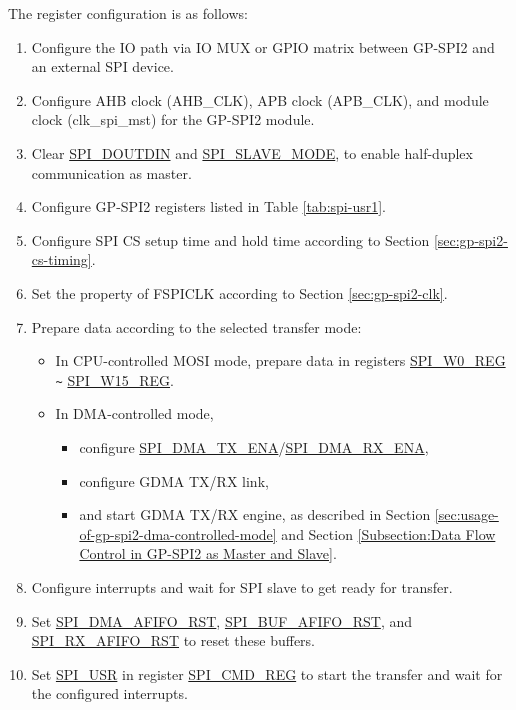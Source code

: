 \documentclass[main\_\_EN.tex]{subfiles}
\begin{document}
The register configuration is as follows:
\begin{enumerate}
    \item Configure the IO path via IO MUX or GPIO matrix between GP-SPI2 and an external SPI device. 
    \item Configure AHB clock (AHB\_CLK), APB clock (APB\_CLK), and module clock (clk\_spi\_mst) for the GP-SPI2 module.

    \item Clear \hyperref[fielddesc:SPIDOUTDIN]{SPI\_DOUTDIN} and \hyperref[fielddesc:SPISLAVEMODE]{SPI\_SLAVE\_MODE}, to enable half-duplex communication as master.
    
    \item Configure GP-SPI2 registers listed in Table \ref{tab:spi-usr1}.
    
    \item Configure SPI CS setup time and hold time according to Section \ref{sec:gp-spi2-cs-timing}.
    
    \item Set the property of FSPICLK according to Section \ref{sec:gp-spi2-clk}. 
    
    \item Prepare data according to the selected transfer mode:
    \begin{itemize}
        \item In CPU-controlled MOSI mode, prepare data in registers \hyperref[regdesc:SPIW0REG]{SPI\_W0\_REG} \verb+~+ \hyperref[regdesc:SPIW0REG]{SPI\_W15\_REG}. 
        
        \item In DMA-controlled mode, 
        \begin{itemize}
            \item configure \hyperref[fielddesc:SPIDMATXENA]{SPI\_DMA\_TX\_ENA}/\hyperref[fielddesc:SPIDMARXENA]{SPI\_DMA\_RX\_ENA},
            \item configure GDMA TX/RX link,
            \item and start GDMA TX/RX engine, as described in Section \ref{sec:usage-of-gp-spi2-dma-controlled-mode} and Section \ref{Subsection:Data Flow Control in GP-SPI2 as Master and Slave}.
        \end{itemize}
    \end{itemize}
    
    \item Configure interrupts and wait for SPI slave to get ready for transfer.
    
    \item Set \hyperref[fielddesc:SPIDMAAFIFORST]{SPI\_DMA\_AFIFO\_RST}, \hyperref[fielddesc:SPIBUFAFIFORST]{SPI\_BUF\_AFIFO\_RST}, and \hyperref[fielddesc:SPIRXAFIFORST]{SPI\_RX\_AFIFO\_RST} to reset these buffers.

    \item Set \hyperref[fielddesc:SPIUSR]{SPI\_USR} in register \hyperref[regdesc:SPICMDREG]{SPI\_CMD\_REG} to start the transfer and wait for the configured interrupts.
\end{enumerate}
\end{document}
